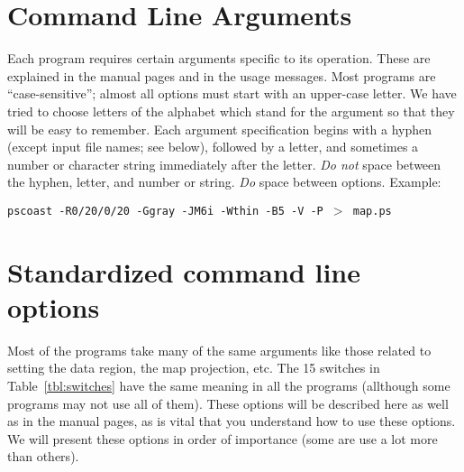 

\section{Command Line Arguments} 
%
%

Each program requires certain arguments specific to its operation.
These are explained in the manual pages and in the usage messages.
Most programs are ``case-sensitive''; almost all options must start
with an upper-case letter.  We have tried to choose letters of the
alphabet which stand for the argument so that they will be easy to
remember.  Each argument specification begins with a hyphen
(except input file names; see below), followed by a letter, and
sometimes a number or character string immediately after the letter.
\emph{Do not} space between the hyphen, letter, and number or string.
\emph{Do} space between options.  Example:

\vspace{\baselineskip} 

\texttt{pscoast -R0/20/0/20 -Ggray -JM6i -Wthin -B5 -V -P $>$ map.ps}

\section{Standardized command line options} 
%
%
\label{sec:stopt}

Most of the programs take many of the same arguments like those
related to setting the data region, the map projection, etc.
The 15 switches in Table~\ref{tbl:switches} have the same meaning
in all the programs (allthough some programs may not use all of them).
These options will be described here as well as in the manual pages,
as is vital that you understand how to use these options.  We will present
these options in order of importance (some are use a lot more than others).

